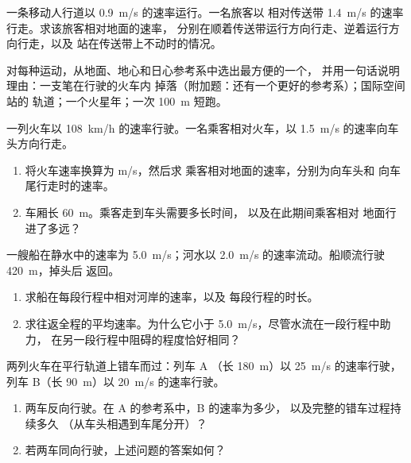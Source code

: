 \begin{exercise}[$\star$]\label{exo:g10:relative-motion:4}
一条移动人行道以 \qty{0.9}{m/s} 的速率运行。一名旅客以
相对传送带 \qty{1.4}{m/s} 的速率行走。求该旅客相对地面的速率，
分别在顺着传送带运行方向行走、逆着运行方向行走，以及
站在传送带上不动时的情况。
\end{exercise}

\begin{exercise}[$\star$]\label{exo:g10:relative-motion:5}
对每种运动，从地面、地心和日心参考系中选出最方便的一个，
并用一句话说明理由：一支笔在行驶的火车内
掉落（附加题：还有一个更好的参考系）；国际空间站的
轨道；一个火星年；一次
\qty{100}{m} 短跑。
\end{exercise}

\begin{exercise}[$\star\star$]\label{exo:g10:relative-motion:6}
一列火车以 \qty{108}{km/h} 的速率行驶。一名乘客相对火车，以
\qty{1.5}{m/s} 的速率向车头方向行走。
\begin{enumerate}
  \item 将火车速率换算为 \unit{m/s}，然后求
        乘客相对地面的速率，分别为向车头和
        向车尾行走时的速率。
  \item 车厢长 \qty{60}{m}。乘客走到车头需要多长时间，
        以及在此期间乘客相对
        地面行进了多远？
\end{enumerate}
\end{exercise}

\begin{exercise}[$\star\star$]\label{exo:g10:relative-motion:7}
一艘船在静水中的速率为 \qty{5.0}{m/s}；河水以
\qty{2.0}{m/s} 的速率流动。船顺流行驶 \qty{420}{m}，掉头后
返回。
\begin{enumerate}
  \item 求船在每段行程中相对河岸的速率，以及
        每段行程的时长。
  \item 求往返全程的平均速率。为什么它小于
        \qty{5.0}{m/s}，尽管水流在一段行程中助力，
        在另一段行程中阻碍的程度恰好相同？
\end{enumerate}
\end{exercise}

\begin{exercise}[$\star\star$]\label{exo:g10:relative-motion:8}
两列火车在平行轨道上错车而过：列车 A
（长 \qty{180}{m}）以 \qty{25}{m/s} 的速率行驶，列车 B（长 \qty{90}{m}）以 \qty{20}{m/s} 的速率行驶。
\begin{enumerate}
  \item 两车反向行驶。在 A 的参考系中，B 的速率为多少，
        以及完整的错车过程持续多久
        （从车头相遇到车尾分开）？
  \item 若两车同向行驶，上述问题的答案如何？
\end{enumerate}
\end{exercise}

